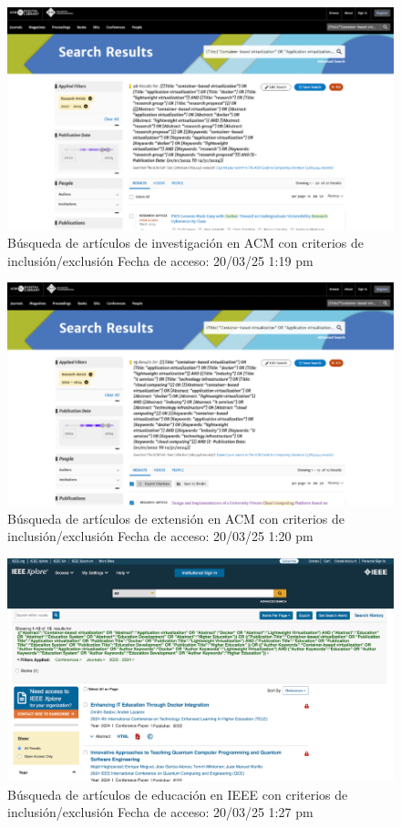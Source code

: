 \FloatBarrier\begin{figure}[H]
    \centering
    \includegraphics[width=\textwidth,keepaspectratio]{apendices/BD/criterios/ACM-inv.png}
    \caption{Búsqueda de artículos de investigación en ACM con criterios de inclusión/exclusión
    Fecha de acceso: 20/03/25 1:19 pm
    }
\end{figure}
\FloatBarrier\begin{figure}[H]
    \centering
    \includegraphics[width=\textwidth,keepaspectratio]{apendices/BD/criterios/ACM-ind.png}
    \caption{Búsqueda de artículos de extensión en ACM con criterios de inclusión/exclusión
    Fecha de acceso: 20/03/25 1:20 pm
    }
\end{figure}
\FloatBarrier\begin{figure}[H]
    \centering
    \includegraphics[width=\textwidth,keepaspectratio]{apendices/BD/criterios/IEEE-ed.png}
    \caption{Búsqueda de artículos de educación en IEEE con criterios de inclusión/exclusión
    Fecha de acceso: 20/03/25 1:27 pm
    }
\end{figure}
